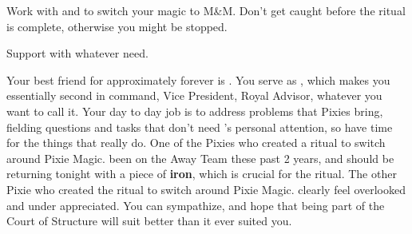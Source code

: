 \documentclass[char]{PP}
\begin{document}
\begin{itemz}
	\item Work with \cMChange{} and \cFWanabe{} to switch your magic to M&M. Don't get caught before the ritual is complete, otherwise you might be stopped.
	\item Support \cSHead{} with whatever \cSHead{\they} need\cSHead{\plural}.
\end{itemz}

\begin{itemz}[Notes]
	\item 
\end{itemz}

\begin{contacts}
	\contact{\cSHead{}} Your best friend for approximately forever is \cSHead{}. You serve as \cSHead{\Their} \cSAdvisor{\Prince}, which makes you essentially \cSHead{\their}second in command, Vice President, Royal Advisor, whatever you want to call it. Your day to day job is to address problems that Pixies bring, fielding questions and tasks that don't need \cSHead{}'s personal attention, so \cSHead{\They} have time for the things that really do.
	\contact{\cMChange{}}  One of the Pixies who created a ritual to switch around Pixie Magic. \cMChange{\They} \cMChange{\have} been on the Away Team these past 2 years, and should be returning tonight with a piece of \textbf{iron}, which is crucial for the ritual.
	\contact{\cFWanabe{}} The other Pixie who created the ritual to switch around Pixie Magic. \cFWanabe{\They} clearly feel\cFWanabe{\plural} overlooked and under appreciated. You can sympathize, and hope that being part of the Court of Structure will suit \cFWanabe{} better than it ever suited you.
\end{contacts}
\end{document}
